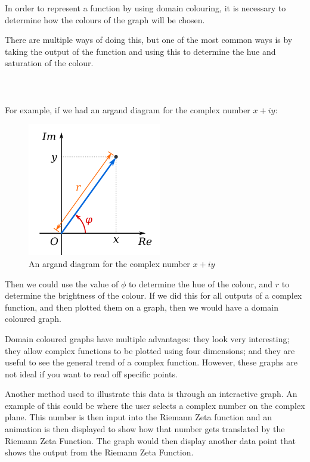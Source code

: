 \documentclass[12pt]{article}
\begin{document}
In order to represent a function by using domain colouring, it is necessary to determine how the colours of the graph will be chosen.

There are multiple ways of doing this, but one of the most common ways is by taking the output of the function and using this to determine the hue and saturation of the colour.
\\
\\
\\
\\
For example, if we had an argand diagram for the complex number $x+iy$:

\begin{figure}[h]
    \centering
    \captionsetup{justification=centering}
    \includegraphics[scale=0.7]{argand-diagram}
    \caption{An argand diagram for the complex number $x+iy$}
\end{figure}

Then we could use the value of $\phi$ to determine the hue of the colour, and $r$ to determine the brightness of the colour.  If we did this for all outputs of a complex function, and then plotted them on a graph, then we would have a domain coloured graph.

Domain coloured graphs have multiple advantages: they look very interesting; they allow complex functions to be plotted using four dimensions; and they are useful to see the general trend of a complex function. However, these graphs are not ideal if you want to read off specific points.

Another method used to illustrate this data is through an interactive graph. An example of this could be where the user selects a complex number on the complex plane. This number is then input into the Riemann Zeta function and an animation is then displayed to show how that number gets translated by the Riemann Zeta Function. The graph would then display another data point that shows the output from the Riemann Zeta Function.
\end{document}
